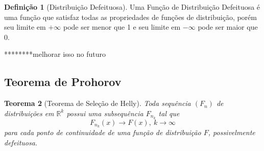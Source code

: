 \documentclass[12pt,a4paper,oneside]{book}
\newtheorem{theorem}{Teorema}[section]
\theoremstyle{definition}
\newtheorem{definition}[theorem]{Defini\c{c}\~ao}
\theoremstyle{remark}
\numberwithin{equation}{section}
\newcommand{\R}{\mathbb{R}}
\begin{document}
\begin{definition}[Distribuição Defeituosa]\label{def-distdefeituosa}
Uma Função de Distribuição Defeituosa é uma função que satisfaz todas as propriedades de funções de distribuição, porém seu limite em $+\infty$ pode ser menor que 1 e seu limite em $-\infty$ pode ser maior que 0.

********melhorar isso no futuro
\end{definition}

\subsection{Teorema de Prohorov}

\begin{tcolorbox}
\begin{theorem}[Teorema de Seleção de Helly]\label{teo- helly} Toda sequência $(F_n)$ de distribuições em $\R^k$ possui uma subsequência $F_{n_k}$ tal que 
$$F_{n_k}(x) \rightarrow F(x),\ k\rightarrow \infty $$
para cada ponto de continuidade de uma função de  distribuição $F$, possivelmente   defeituosa.
\end{theorem}
\end{tcolorbox}
\end{document}
